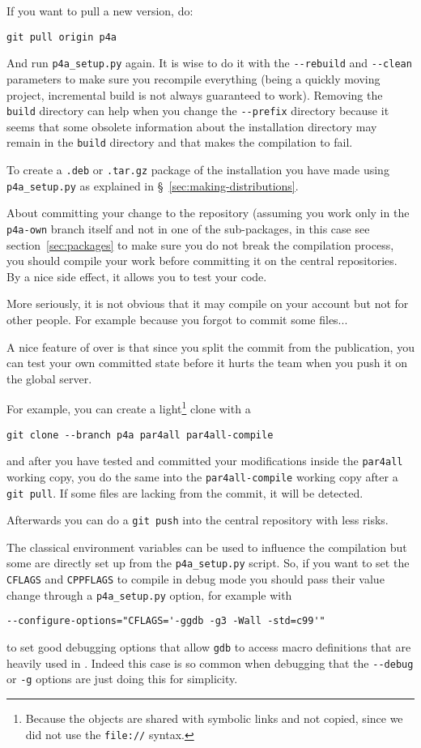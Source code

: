 \documentclass[a4paper]{article}
\begin{document}
If you want to pull a new version, do:
\begin{verbatim}
git pull origin p4a
\end{verbatim}

And run \verb|p4a_setup.py| again. It is wise to do it with the
\verb|--rebuild| and \verb|--clean| parameters to make sure you recompile
everything (\Apips being a quickly moving project, incremental build is
not always guaranteed to work). Removing the \texttt{build} directory can
help when you change the \verb|--prefix| directory because it seems that
some obsolete information about the installation directory may remain in
the \texttt{build} directory and that makes the compilation to fail.

To create a \texttt{.deb} or \texttt{.tar.gz} package of the installation
you have made using \verb|p4a_setup.py| as explained in
\S~\ref{sec:making-distributions}.

About committing your change to the \Agit repository (assuming you work
only in the \texttt{p4a-own} branch itself and not in one of the \Apfa
sub-packages, in this case see section~\ref{sec:packages} to make sure you
do not break the compilation process, you should compile your work before
committing it on the central repositories. By a nice side effect, it
allows you to test your code. \smiley

More seriously, it is not obvious that it may compile on your account but
not for other people. For example because you forgot to commit some
files...

A nice feature of \Agit over \Asvn is that since you split the commit from
the publication, you can test your own committed state before it hurts the
team when you push it on the global server.

For example, you can create a light\footnote{Because the objects are
  shared with symbolic links and not copied, since we did not use the
  \texttt{file://} syntax.} clone with a
\begin{verbatim}
git clone --branch p4a par4all par4all-compile
\end{verbatim}
and after you have tested and committed your modifications inside the
\texttt{par4all} working copy, you do the same into the
\texttt{par4all-compile} working copy after a \texttt{git pull}.
If some files are lacking from the commit, it will be detected.

Afterwards you can do a \texttt{git push} into the central \Apfa
repository with less risks.

The classical \Aautotools environment variables can be used to influence
the compilation but some are directly set up from the \verb|p4a_setup.py|
script. So, if you want to set the \texttt{CFLAGS} and \texttt{CPPFLAGS}
to compile \Apfa in debug mode you should pass their value change through
a \verb|p4a_setup.py| option, for example with
\begin{verbatim}
--configure-options="CFLAGS='-ggdb -g3 -Wall -std=c99'"
\end{verbatim}
to set good debugging options that allow \texttt{gdb} to access macro
definitions that are heavily used in \Apips. Indeed this case is so common
when debugging \Apfa that the \verb|--debug| or \verb|-g| options are just
doing this for simplicity.
\end{document}
